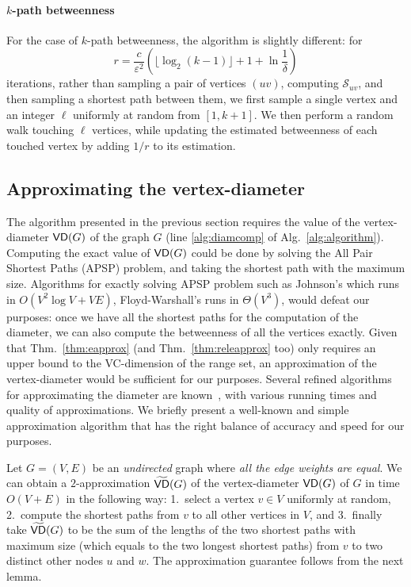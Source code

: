 \paragraph{$k$-path betweenness}
For the case of $k$-path betweenness, the algorithm is slightly different:
for 
\[
  r= \frac{c}{\varepsilon^2}\left(\lfloor\log_2(k-1)\rfloor + 1 +\ln\frac{1}{\delta}\right)
\]
iterations, rather than sampling a pair of vertices $(uv)$, computing
$\mathcal{S}_{uv}$, and then sampling a shortest path between them, we first sample a
single vertex and an integer $\ell$ uniformly at random from $[1,k+1]$. We then
perform a random walk touching $\ell$ vertices, while updating the estimated
betweenness of each touched vertex by adding $1/r$ to its estimation.

\subsection{Approximating the vertex-diameter}\label{sec:diam}
The algorithm presented in the previous section requires the value of the
vertex-diameter $\mathsf{VD}(G)$ of the graph $G$ (line
\ref{alg:diamcomp} of Alg.~\ref{alg:algorithm}). 
Computing the exact value of $\mathsf{VD}(G)$ could be done by solving the All Pair
Shortest Paths (APSP) problem, and taking the shortest path with the maximum size.
Algorithms for exactly solving APSP problem such as Johnson's which runs in
$O(V^2\log V+VE)$, Floyd-Warshall's runs in $\Theta(V^3)$, would defeat our
purposes: once we have all the shortest paths for the computation of
the diameter, we can also compute the betweenness of all the vertices exactly. 
Given that Thm.~\ref{thm:eapprox} (and Thm.~\ref{thm:releapprox} too) only
requires an upper bound to the VC-dimension of the range set, an approximation
of the vertex-diameter would be sufficient for our purposes. Several refined
algorithms for approximating the diameter are
known~\citep{AingwordCIM99,BoitmanisFL06,RodittyW12}, with various running times
and quality of approximations. We briefly present a well-known and simple
approximation algorithm that has the right balance of accuracy and speed
for our purposes.

Let $G=(V,E)$ be an \emph{undirected} graph where \emph{all the edge weights are
equal}.
We can obtain a $2$-approximation $\widetilde{\mathsf{VD}}(G)$ of the vertex-diameter $\mathsf{VD}(G)$ of
$G$ in time $O(V+E)$ in the following way: 1.~select a vertex $v\in V$ uniformly
at random, 2.~compute the shortest paths from $v$ to all other vertices in $V$,
and 3.~finally take $\widetilde{\mathsf{VD}}(G)$ to be the sum of the lengths of the two
shortest paths with maximum size (which equals to the two longest shortest
paths) from $v$ to two distinct other nodes $u$ and $w$. The approximation
guarantee follows from the next lemma.

